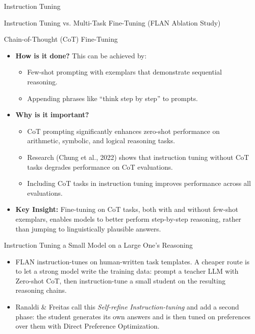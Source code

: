 \begin{frame}[allowframebreaks]{Instruction Tuning}
\begin{block}{Instruction Tuning vs. Multi-Task Fine-Tuning (FLAN Ablation Study)}
\begin{itemize}
        \end{itemize}
    \end{block}
    \framebreak
    \begin{block}{Chain-of-Thought (CoT) Fine-Tuning}
        \begin{itemize}
            \item \textbf{How is it done?} This can be achieved by:
            \begin{itemize}
                \item Few-shot prompting with exemplars that demonstrate sequential reasoning.
                \item Appending phrases like ``think step by step'' to prompts.
            \end{itemize}
            \item \textbf{Why is it important?}
            \begin{itemize}
                \item CoT prompting significantly enhances zero-shot performance on arithmetic, symbolic, and logical reasoning tasks.
                \item Research (Chung et al., 2022) shows that instruction tuning without CoT tasks degrades performance on CoT evaluations.
                \item Including CoT tasks in instruction tuning improves performance across all evaluations.
            \end{itemize}
            \item \textbf{Key Insight:} Fine-tuning on CoT tasks, both with and without few-shot exemplars, enables models to better perform step-by-step reasoning, rather than jumping to linguistically plausible answers.
        \end{itemize}
    \end{block}
    \framebreak
    \begin{block}{Instruction Tuning a Small Model on a Large One's Reasoning}
        \begin{itemize}
            \setlength{\itemsep}{0.5em}
            \item FLAN instruction-tunes on human-written task templates. A cheaper route is to let a strong model write the training data: prompt a teacher LLM with Zero-shot CoT, then instruction-tune a small student on the resulting reasoning chains.
            \item Ranaldi \& Freitas call this \textit{Self-refine Instruction-tuning} and add a second phase: the student generates its own answers and is then tuned on preferences over them with Direct Preference Optimization.

\end{itemize}
\end{block}
\end{frame}
